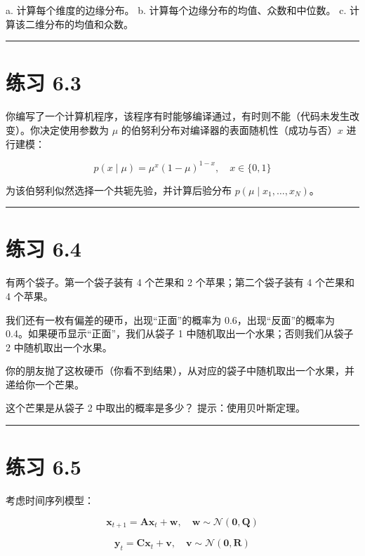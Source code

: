 a. 计算每个维度的边缘分布。 b. 计算每个边缘分布的均值、众数和中位数。 c. 计算该二维分布的均值和众数。

\medskip\hrule\medskip

\section*{练习 6.3}

你编写了一个计算机程序，该程序有时能够编译通过，有时则不能（代码未发生改变）。你决定使用参数为 $ \mu $ 的伯努利分布对编译器的表面随机性（成功与否）$ x $ 进行建模：

\begin{equation*}
p(x \mid \mu) = \mu^x (1 - \mu)^{1-x}, \quad x \in \{0, 1\}
\end{equation*}

为该伯努利似然选择一个共轭先验，并计算后验分布 $ p(\mu \mid x_1, \ldots, x_N) $。

\medskip\hrule\medskip

\section*{练习 6.4}

有两个袋子。第一个袋子装有 4 个芒果和 2 个苹果；第二个袋子装有 4 个芒果和 4 个苹果。

我们还有一枚有偏差的硬币，出现“正面”的概率为 0.6，出现“反面”的概率为 0.4。如果硬币显示“正面”，我们从袋子 1 中随机取出一个水果；否则我们从袋子 2 中随机取出一个水果。

你的朋友抛了这枚硬币（你看不到结果），从对应的袋子中随机取出一个水果，并递给你一个芒果。

这个芒果是从袋子 2 中取出的概率是多少？ 提示：使用贝叶斯定理。

\medskip\hrule\medskip

\section*{练习 6.5}

考虑时间序列模型：

\begin{equation*}
\boldsymbol{x}_{t+1} = \boldsymbol{A} \boldsymbol{x}_t + \boldsymbol{w}, \quad \boldsymbol{w} \sim \mathcal{N}(\boldsymbol{0}, \boldsymbol{Q})
\end{equation*}

\begin{equation*}
\boldsymbol{y}_t = \boldsymbol{C} \boldsymbol{x}_t + \boldsymbol{v}, \quad \boldsymbol{v} \sim \mathcal{N}(\boldsymbol{0}, \boldsymbol{R})
\end{equation*}

